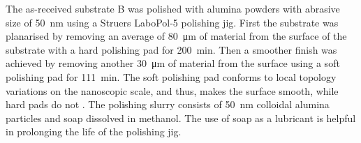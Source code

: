 %

The as-received substrate B was polished with alumina powders with abrasive size of \SI{50}{\nano\metre} using a Struers LaboPol-5 polishing jig. First the substrate was planarised by removing an average of \SI{80}{\micro\metre} of material from the surface of the substrate with a hard polishing pad for \SI{200}{\minute}. Then a smoother finish was achieved by removing another \SI{30}{\micro\metre} of material from the surface using a soft polishing pad for \SI{111}{\minute}. The soft polishing pad conforms to local topology variations on the nanoscopic scale, and thus, makes the surface smooth, while hard pads do not \citep{lee2000nanotopography}. The polishing slurry consists of \SI{50}{\nano\metre} colloidal alumina particles and soap dissolved in methanol. The use of soap as a lubricant is helpful in prolonging the life of the polishing jig.


